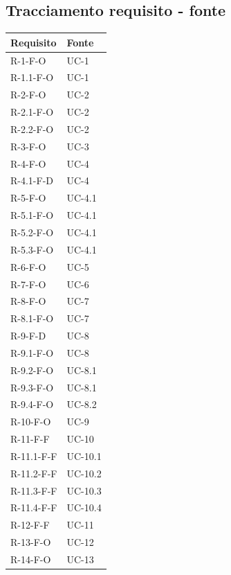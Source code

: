 \subsection{Tracciamento requisito - fonte}\label{subsec:tracciamento-requisiti---fonte}
\renewcommand{\arraystretch}{1.5}
\begin{center}
    \begin{longtable}{| C{6cm} |C{6cm}|}
        \hline
        \textbf{Requisito} & \textbf{Fonte} \\\hline
        R-1-F-O&UC-1\\\hline
        R-1.1-F-O&UC-1\\\hline
        R-2-F-O&UC-2\\\hline
        R-2.1-F-O&UC-2\\\hline
        R-2.2-F-O&UC-2\\\hline
        R-3-F-O&UC-3\\\hline
        R-4-F-O&UC-4\\\hline
        R-4.1-F-D&UC-4\\\hline
        R-5-F-O&UC-4.1\\\hline
        R-5.1-F-O&UC-4.1\\\hline
        R-5.2-F-O&UC-4.1\\\hline
        R-5.3-F-O&UC-4.1\\\hline
        R-6-F-O&UC-5\\\hline
        R-7-F-O&UC-6\\\hline
        R-8-F-O&UC-7\\\hline
        R-8.1-F-O&UC-7\\\hline
        R-9-F-D&UC-8\\\hline
        R-9.1-F-O&UC-8\\\hline
        R-9.2-F-O&UC-8.1\\\hline
        R-9.3-F-O&UC-8.1\\\hline
        R-9.4-F-O&UC-8.2\\\hline
        R-10-F-O&UC-9\\\hline
        R-11-F-F&UC-10\\\hline
        R-11.1-F-F&UC-10.1\\\hline
        R-11.2-F-F&UC-10.2\\\hline
        R-11.3-F-F&UC-10.3\\\hline
        R-11.4-F-F&UC-10.4\\\hline
        R-12-F-F&UC-11\\\hline
        R-13-F-O&UC-12\\\hline
        R-14-F-O& UC-13\\\hline

\end{longtable}
\end{center}
